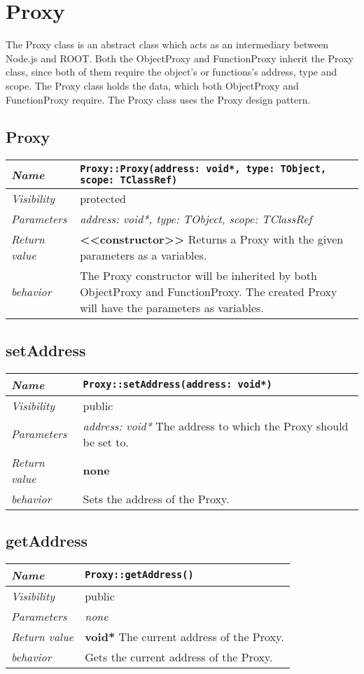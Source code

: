 \chapter{Proxy}
The Proxy class is an abstract class which acts as an intermediary between Node.js and ROOT. Both the ObjectProxy and FunctionProxy inherit the Proxy class, since both of them require the object's or functions's address, type and scope. The Proxy class holds the data, which both ObjectProxy and FunctionProxy require. The Proxy class uses the Proxy design pattern.
\section{Proxy}
\begin{longtable}{p{3cm} @{\hskip 1cm} p{12cm}}
 \hline
\textit{Name} & \texttt{Proxy::Proxy(address: void*, type: TObject, scope: TClassRef)}\\
\hline
 \textit{Visibility} & protected\\
\hline
\textit{Parameters} & \textit{address: void*, type: TObject, scope: TClassRef}\\
\hline
\textit{Return value} & \textbf{ <<constructor>>} Returns a Proxy with the given parameters as a variables. \\
  \hline
 \textit{behavior} & The Proxy constructor will be inherited by both ObjectProxy and FunctionProxy.
 The created Proxy will have the parameters as variables. \\
\hline
\end{longtable} \pagebreak
 \section{setAddress}
\begin{longtable}{p{3cm} @{\hskip 1cm} p{12cm}}
 \hline
\textit{Name} & \texttt{Proxy::setAddress(address: void*)}\\
\hline
 \textit{Visibility} & public\\
\hline
\textit{Parameters} & \textit{address: void*} The address to which the Proxy should be set to. \\
\hline
\textit{Return value} & \textbf{none}\\
  \hline
 \textit{behavior} & Sets the address of the Proxy. \\
\hline
\end{longtable} \pagebreak
 \section{getAddress}
\begin{longtable}{p{3cm} @{\hskip 1cm} p{12cm}}
 \hline
\textit{Name} & \texttt{Proxy::getAddress()}\\
\hline
 \textit{Visibility} & public\\
\hline
\textit{Parameters} & \textit{none}\\
\hline
\textit{Return value} & \textbf{ void*} The current address of the Proxy. \\
  \hline
 \textit{behavior} & Gets the current address of the Proxy. \\
\hline
\end{longtable} \pagebreak
